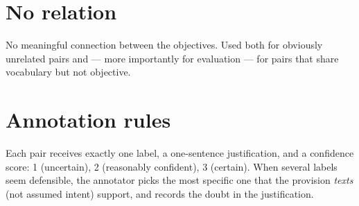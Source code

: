 \section*{No relation}
No meaningful connection between the objectives. Used both for obviously
unrelated pairs and --- more importantly for evaluation --- for pairs that
share vocabulary but not objective.

\section*{Annotation rules}
Each pair receives exactly one label, a one-sentence justification, and a
confidence score: 1 (uncertain), 2 (reasonably confident), 3 (certain). When
several labels seem defensible, the annotator picks the most specific one
that the provision \emph{texts} (not assumed intent) support, and records the
doubt in the justification.
